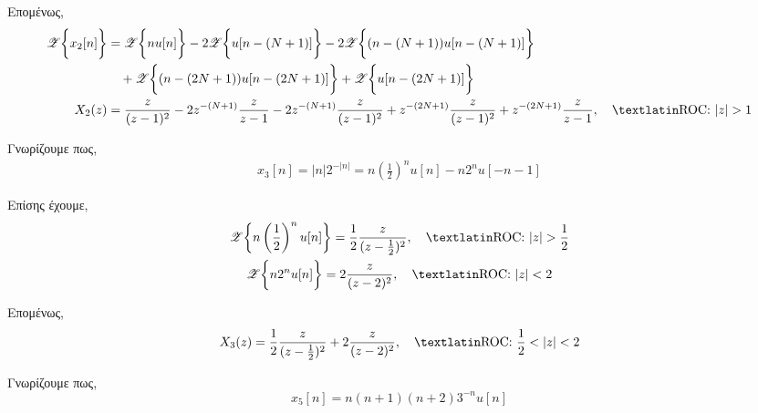 \documentclass{assignment}
\begin{document}
\begin{answers}
Επομένως,
\begin{align*} 
\mathscr{Z}\bigg\{x_2[n]\bigg\} &=  \mathscr{Z}\bigg\{nu[n]\bigg\} -2\mathscr{Z}\bigg\{u[n-(N+1)]\bigg\} 
                                                   -2\mathscr{Z}\bigg\{(n-(N+1))u[n-(N+1)]\bigg\} \\
       &\quad + \mathscr{Z}\bigg\{(n-(2N+1))u[n-(2N+1)]\bigg\} + \mathscr{Z}\bigg\{u[n-(2N+1)]\bigg\}\\
       X_2(z) &= \frac{z}{(z-1)^2} -2 z^{-(N+1)}\frac{z}{z-1} -2z^{-(N+1)}\frac{z}{(z-1)^2} 
              + z^{-(2N+1)}\frac{z}{(z-1)^2}+ z^{-(2N+1)}\frac{z}{z-1} ,\quad \text{\en{ROC: }} |z| > 1
\end{align*}



\answer

Γνωρίζουμε πως,
\begin{gather*} x_3[n] = |n|2^{-|n|} = n\left(\frac{1}{2}\right)^{n}u[n] - n2^nu[-n-1]\end{gather*}

Επίσης έχουμε, 
\begin{gather*} 
\mathscr{Z}\bigg\{n\left(\frac{1}{2}\right)^nu[n]\bigg\} = 
  \frac{1}{2}\frac{z}{(z-\frac{1}{2})^2}, \quad\text{\en{ROC:} }|z| > \frac{1}{2} \\
\mathscr{Z}\bigg\{n2^nu[n]\bigg\} = 2\frac{z}{(z-2)^2}, \quad\text{\en{ROC:} }|z| < 2
\end{gather*}

Επομένως,
\begin{gather*}
X_3(z) = \frac{1}{2}\frac{z}{(z-\frac{1}{2})^2} + 2\frac{z}{(z-2)^2}, \quad\text{\en{ROC: }}\frac{1}{2} < |z| < 2 
\end{gather*}

\answer
Γνωρίζουμε πως,
\begin{equation*}x_5[n] = n(n+1)(n+2)3^{-n}u[n]\end{equation*}


\end{answers}
\end{document}
